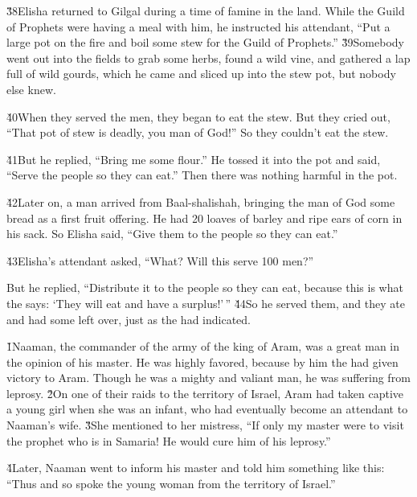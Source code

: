 \v{38}Elisha returned to Gilgal during a time of famine in the land. While the Guild of Prophets were having a meal with him, he instructed his attendant, ``Put a large pot on the fire and boil some stew for the Guild of Prophets.'' \v{39}Somebody went out into the fields to grab some herbs, found a wild vine, and gathered a lap full of wild gourds, which he came and sliced up into the stew pot, but nobody else knew.

\v{40}When they served the men, they began to eat the stew. But they cried out, ``That pot of stew is deadly, you man of God!'' So they couldn't eat the stew.

\v{41}But he replied, ``Bring me some flour.'' He tossed it into the pot and said, ``Serve the people so they can eat.'' Then there was nothing harmful in the pot.

\v{42}Later on, a man arrived from Baal-shalishah, bringing the man of God some bread as a first fruit offering. He had 20 loaves of barley and ripe ears of corn in his sack. So Elisha said, ``Give them to the people so they can eat.''

\v{43}Elisha's attendant asked, ``What? Will this serve 100 men?''

But he replied, ``Distribute it to the people so they can eat, because this is what the  says: `They will eat and have a surplus!'\,'' \v{44}So he served them, and they ate and had some left over, just as the  had indicated.

\v{1}Naaman, the commander of the army of the king of Aram, was a great man in the opinion of his master. He was highly favored, because by him the  had given victory to Aram. Though he was a mighty and valiant man, he was suffering from leprosy. \v{2}On one of their raids to the territory of Israel, Aram had taken captive a young girl when she was an infant, who had eventually become an attendant to Naaman's wife. \v{3}She mentioned to her mistress, ``If only my master were to visit the prophet who is in Samaria! He would cure him of his leprosy.''

\v{4}Later, Naaman went to inform his master and told him something like this: ``Thus and so spoke the young woman from the territory of Israel.''

